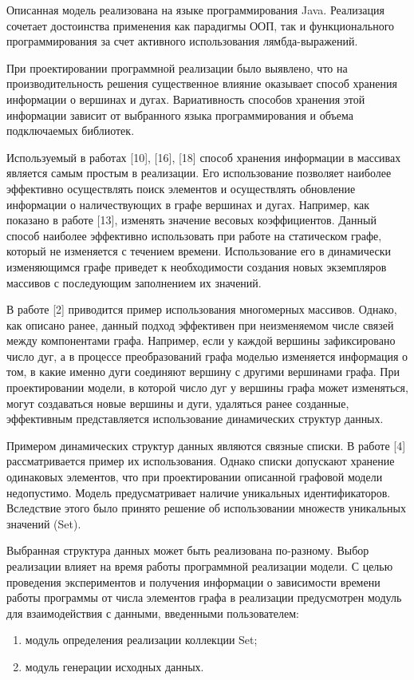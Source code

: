 Описанная модель реализована на языке программирования Java. Реализация сочетает достоинства применения как парадигмы ООП, так и функционального программирования за счет активного использования лямбда-выражений.

При проектировании программной реализации было выявлено, что на производительность решения существенное влияние оказывает способ хранения информации о вершинах и дугах. Вариативность способов хранения этой информации зависит от выбранного языка программирования и объема подключаемых библиотек.

Используемый в работах [10], [16], [18] способ хранения информации в массивах является самым простым в реализации. Его использование позволяет наиболее эффективно осуществлять поиск элементов и осуществлять обновление информации о наличествующих в графе вершинах и дугах. Например, как показано в работе [13], изменять значение весовых коэффициентов. Данный способ наиболее эффективно использовать при работе на статическом графе, который не изменяется с течением времени. Использование его в динамически изменяющимся графе приведет к необходимости создания новых экземпляров массивов с последующим заполнением их значений.

В работе [2] приводится пример использования многомерных массивов. Однако, как описано ранее, данный подход эффективен при неизменяемом числе связей между компонентами графа. Например, если у каждой вершины зафиксировано число дуг, а в процессе преобразований графа моделью изменяется информация о том, в какие именно дуги соединяют вершину с другими вершинами графа. При проектировании модели, в которой число дуг у вершины графа может изменяться, могут создаваться новые вершины и дуги, удаляться ранее созданные, эффективным представляется использование динамических структур данных.

Примером динамических структур данных являются связные списки. В работе [4] рассматривается пример их использования. Однако списки допускают хранение одинаковых элементов, что при проектировании описанной графовой модели недопустимо. Модель предусматривает наличие уникальных идентификаторов. Вследствие этого было принято решение об использовании множеств уникальных значений (Set).

Выбранная структура данных может быть реализована по-разному. Выбор реализации влияет на время работы программной реализации модели. С целью проведения экспериментов и получения информации о зависимости времени работы программы от числа элементов графа в реализации предусмотрен модуль для взаимодействия с данными, введенными пользователем:
\begin{enumerate}
    \item модуль определения реализации коллекции Set;
    \item модуль генерации исходных данных.
\end{enumerate}

